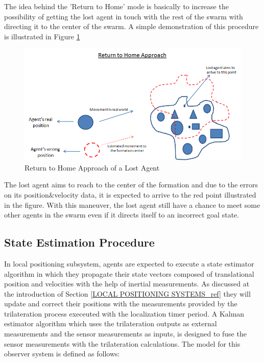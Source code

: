 The idea behind the 'Return to Home' mode is basically to increase the possibility of getting the lost agent in touch with the rest of the swarm with directing it to the center of the swarm. A simple demonstration of this procedure is illustrated in Figure \ref{return_home_ref}
	
\begin{figure}[H]
\caption{Return to Home Approach of a Lost Agent} \label{return_home_ref}
\centering
\includegraphics[scale = 0.60]{return_home}
\end{figure}
	
The lost agent aims to reach to the center of the formation and due to the errors on its position$\&$velocity data, it is expected to arrive to the red point illustrated in the figure. With this maneuver, the lost agent still have a chance to meet some other agents in the swarm even if it directs itself to an incorrect goal state.
	
\subsection{State Estimation Procedure} \label{StateEstimationref}
In local positioning subsystem, agents are expected to execute a state estimator algorithm in which they propagate their state vectors composed of translational position and velocities with the help of inertial measurements. As discussed at the introduction of Section \ref{LOCAL POSITIONING SYSTEMS_ref} they will update and correct their positions with the measurements provided by the trilateration process execeuted with the localization timer period. A Kalman estimator algorithm which uses the trilateration outputs as external measurements and the sensor measurements as inputs, is designed to fuse the sensor measurements with the trilateration calculations. The model for this observer system is defined as follows:
	
